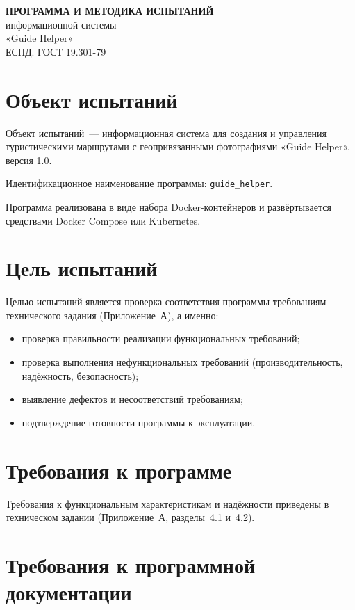 
\begin{center}
\textbf{ПРОГРАММА И МЕТОДИКА ИСПЫТАНИЙ}\\
информационной системы\\
«Guide Helper»\\
\vspace{0.5em}
ЕСПД. ГОСТ 19.301-79~\cite{gost19301}
\end{center}

\section{Объект испытаний}

Объект испытаний~--- информационная система для создания и управления туристическими маршрутами с геопривязанными фотографиями «Guide Helper», версия 1.0.

Идентификационное наименование программы: \texttt{guide\_helper}.

Программа реализована в виде набора Docker-контейнеров и развёртывается средствами Docker Compose или Kubernetes.

\section{Цель испытаний}

Целью испытаний является проверка соответствия программы требованиям технического задания (Приложение~А), а именно:
\begin{itemize}
  \item проверка правильности реализации функциональных требований;
  \item проверка выполнения нефункциональных требований (производительность, надёжность, безопасность);
  \item выявление дефектов и несоответствий требованиям;
  \item подтверждение готовности программы к эксплуатации.
\end{itemize}

\section{Требования к программе}

Требования к функциональным характеристикам и надёжности приведены в техническом задании (Приложение~А, разделы~4.1 и~4.2).

\section{Требования к программной документации}

